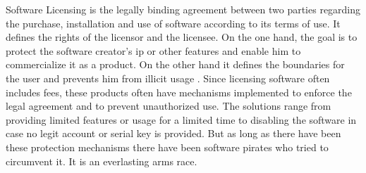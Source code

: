 Software Licensing is the legally binding agreement between two parties regarding the purchase, installation and use of software according to its terms of use.
It defines the rights of the licensor and the licensee.
On the one hand, the goal is to protect the software creator's \gls{ip} or other features and enable him to commercialize it as a product.
On the other hand it defines the boundaries for the user and prevents him from illicit usage \cite{uncgLicensing}.
\newline
\newline
Since licensing software often includes fees, these products often have mechanisms implemented to enforce the legal agreement and to prevent unauthorized use.
The solutions range from providing limited features or usage for a limited time to disabling the software in case no legit account or serial key is provided.
\newline
\newline
But as long as there have been these protection mechanisms there have been software pirates who tried to circumvent it. It is an everlasting arms race\cite{szCopy}.


%

%

%
%

%
%



